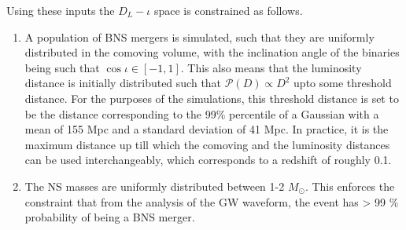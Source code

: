     Using these inputs the $D_L-\iota$ space is constrained as follows.
    \begin{enumerate}

        \item A population of BNS mergers is simulated, such that they are uniformly
            distributed in the comoving volume, with the inclination angle of the
            binaries being such that $\cos \iota \in [-1, 1]$. This also means that the
            luminosity distance is initially distributed such that $\mathcal{P}(D)
            \propto D^2$ upto some threshold distance. For the purposes of the
            simulations, this threshold distance is set to be the distance corresponding
            to the 99\% percentile of a Gaussian with a mean of 155 Mpc and a standard
            deviation of 41 Mpc. In practice, it is the maximum distance up till which
            the comoving and the luminosity distances can be used interchangeably, which
            corresponds to a redshift of roughly 0.1.

        \item The NS masses are uniformly distributed between 1-2 $M_{\odot}$. This
            enforces the constraint that from the analysis of the GW waveform, the event
            has > 99 \% probability of being a BNS merger.


\end{enumerate}
